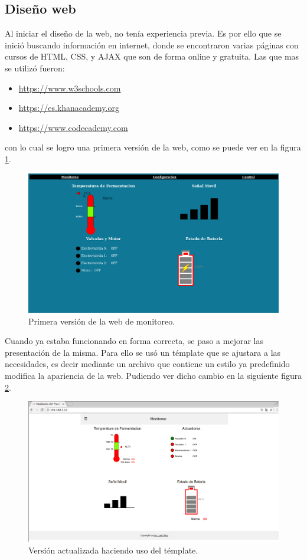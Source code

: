 \subsection*{Diseño web}
Al iniciar el diseño de la web, no tenía experiencia previa. Es por ello que se inició buscando información en internet, donde se encontraron varias páginas con cursos de HTML, CSS, y AJAX que son de forma online y gratuita. Las que mas se utilizó fueron:
\begin{itemize}
  \item \url{https://www.w3schools.com}
  \item \url{https://es.khanacademy.org}
  \item \url{https://www.codecademy.com}
\end{itemize}
  con lo cual se logro una primera versión de la web, como se puede ver en la figura \ref{fig:old_web}.
\begin{figure}[!htb]
    \centering
    \includegraphics[scale=.25]{./Figures/old_web.png}
    \caption{Primera versión de la web de monitoreo.}
    \label{fig:old_web}
\end{figure}

Cuando ya estaba funcionando en forma correcta, se paso a mejorar las presentación de la misma. Para ello se usó un témplate que se ajustara a las necesidades, es decir mediante un archivo que contiene un estilo ya predefinido modifica la apariencia de la web. Pudiendo ver dicho cambio en la siguiente figura \ref{fig:web_monitoreo}.

\begin{figure}[!h]
  \centering
  \includegraphics[scale=.25]{./Figures/web_monitoreo.png}
  \caption{Versión actualizada haciendo uso del témplate.}
  \label{fig:web_monitoreo}
\end{figure}

